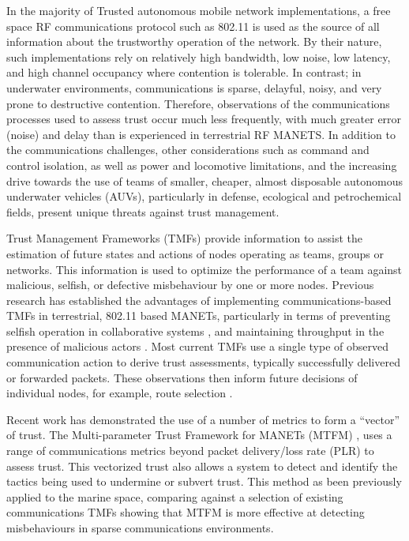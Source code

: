 \documentclass[conference]{IEEEtran}
\begin{document}
In the majority of Trusted autonomous mobile network implementations, a free space RF communications protocol such as 802.11 is used as the source of all information about the trustworthy operation of the network.
By their nature, such implementations rely on relatively high bandwidth, low noise, low latency, and high channel occupancy where contention is tolerable.
In contrast; in underwater environments, communications is sparse, delayful, noisy, and very prone to destructive contention.
Therefore, observations of the communications processes used to assess trust occur much less frequently, with much greater error (noise) and delay than is experienced in terrestrial RF MANETS.
In addition to the communications challenges, other considerations such as command and control isolation, as well as power and locomotive limitations, and the increasing drive towards the use of teams of smaller, cheaper, almost disposable autonomous underwater vehicles (AUVs), particularly in defense, ecological and petrochemical fields, present unique threats against trust management. 

Trust Management Frameworks (TMFs) provide information to assist the estimation of future states and actions of nodes operating as teams, groups or networks. 
This information is used to optimize the performance of a team against malicious, selfish, or defective misbehaviour by one or more nodes.
Previous research has established the advantages of implementing communications-based TMFs in terrestrial, 802.11 based MANETs, particularly in terms of preventing selfish operation in collaborative systems \cite{Li2007}, and maintaining throughput in the presence of malicious actors \cite{Buchegger2002}. 
Most current TMFs use a single type of observed communication action to derive trust assessments, typically successfully delivered or forwarded packets. 
These observations then inform future decisions of individual nodes, for example, route selection \cite{Li2008}.

Recent work has demonstrated the use of a number of metrics to form a ``vector'' of trust. The Multi-parameter Trust Framework for MANETs (MTFM) \cite{Guo11}, uses a range of communications metrics beyond packet delivery/loss rate (PLR) to assess trust. This vectorized trust also allows a system to detect and identify the tactics being used to undermine or subvert trust. 
This method as been previously applied to the marine space, comparing against a selection of existing communications TMFs \cite{Bolster2015} showing that MTFM is more effective at detecting misbehaviours in sparse communications environments. 
\end{document}
